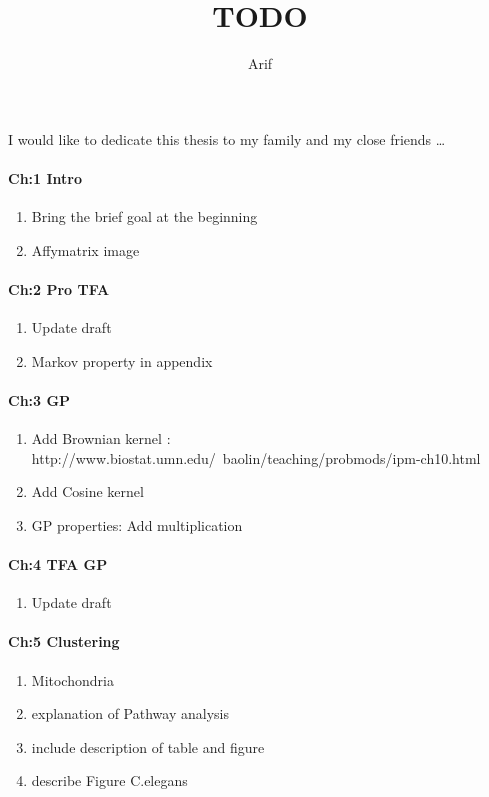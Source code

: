 \documentclass[a4paper,10pt]{article}
\title{TODO}
\author{Arif}
\begin{document}
\maketitle

I would like to dedicate this thesis to my family and my close friends \dots

\paragraph{Ch:1 Intro}
\begin{enumerate}
 \item Bring the brief goal at the beginning 
 \item Affymatrix image
\end{enumerate}

\paragraph{Ch:2 Pro TFA}
\begin{enumerate}
 \item Update draft
 \item Markov property in appendix 
\end{enumerate}

\paragraph{Ch:3 GP}
\begin{enumerate}
 \item Add Brownian kernel : http://www.biostat.umn.edu/~baolin/teaching/probmods/ipm-ch10.html
 \item Add Cosine kernel %
 \item GP properties: Add multiplication %
\end{enumerate}

\paragraph{Ch:4 TFA GP}
\begin{enumerate}
 \item Update draft
\end{enumerate}

\paragraph{Ch:5 Clustering}
\begin{enumerate}
 \item Mitochondria
 \item explanation of Pathway analysis
 \item include description of table and figure
 \item describe Figure C.elegans
\end{enumerate}
\end{document}
